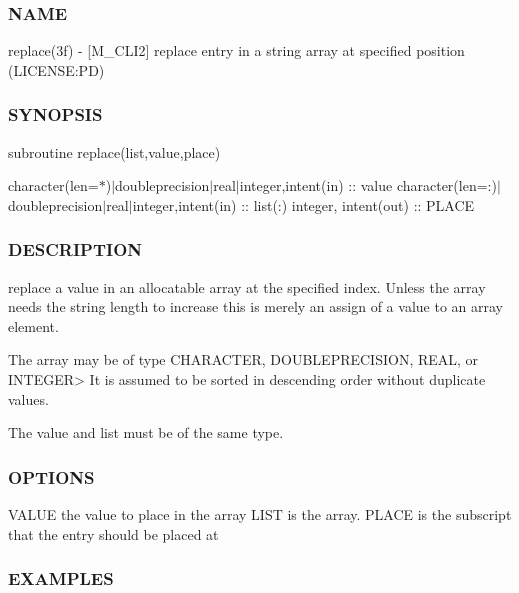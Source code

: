 \subsubsection*{N\+A\+ME}

replace(3f) -\/ \mbox{[}M\+\_\+\+C\+L\+I2\mbox{]} replace entry in a string array at specified position (L\+I\+C\+E\+N\+SE\+:PD) 

\subsubsection*{S\+Y\+N\+O\+P\+S\+IS}

subroutine replace(list,value,place)

character(len=$\ast$)$\vert$doubleprecision$\vert$real$\vert$integer,intent(in) \+:\+: value character(len=\+:)$\vert$doubleprecision$\vert$real$\vert$integer,intent(in) \+:\+: list(\+:) integer, intent(out) \+:\+: P\+L\+A\+CE

\subsubsection*{D\+E\+S\+C\+R\+I\+P\+T\+I\+ON}

\begin{DoxyVerb}replace a value in an allocatable array at the specified index. Unless the
array needs the string length to increase this is merely an assign of a value
to an array element.

The array may be of type CHARACTER, DOUBLEPRECISION, REAL, or INTEGER>
It is assumed to be sorted in descending order without duplicate values.

The value and list must be of the same type.
\end{DoxyVerb}


\subsubsection*{O\+P\+T\+I\+O\+NS}

\begin{DoxyVerb}VALUE         the value to place in the array
LIST          is the array.
PLACE         is the subscript that the entry should be placed at
\end{DoxyVerb}


\subsubsection*{E\+X\+A\+M\+P\+L\+ES}

